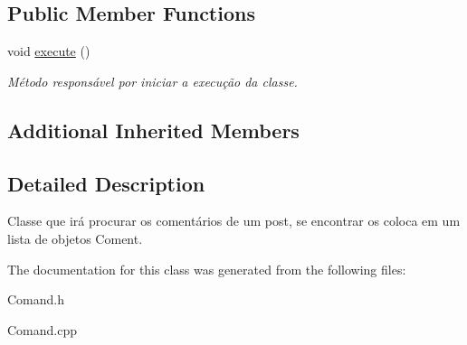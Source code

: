 \subsection*{Public Member Functions}
\begin{DoxyCompactItemize}
\item 
\hypertarget{class_command_find_post_coments_a9e9fdb81a5355d61e93e803adbcf5257}{void \hyperlink{class_command_find_post_coments_a9e9fdb81a5355d61e93e803adbcf5257}{execute} ()}\label{class_command_find_post_coments_a9e9fdb81a5355d61e93e803adbcf5257}

\begin{DoxyCompactList}\small\item\em Método responsável por iniciar a execução da classe. \end{DoxyCompactList}\end{DoxyCompactItemize}
\subsection*{Additional Inherited Members}


\subsection{Detailed Description}
Classe que irá procurar os comentários de um post, se encontrar os coloca em um lista de objetos Coment. 

The documentation for this class was generated from the following files\-:\begin{DoxyCompactItemize}
\item 
Comand.\-h\item 
Comand.\-cpp\end{DoxyCompactItemize}
